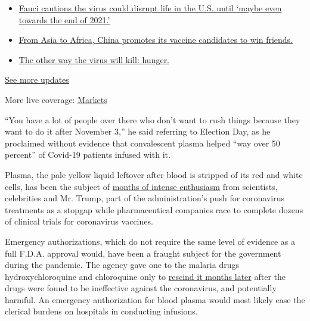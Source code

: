 \begin{itemize}
\tightlist
\item
  \href{https://www.nytimes3xbfgragh.onion/2020/09/11/world/covid-19-coronavirus.html?action=click\&pgtype=Article\&state=default\&region=MAIN_CONTENT_1\&context=storylines_live_updates\#link-dfb8a16}{Fauci
  cautions the virus could disrupt life in the U.S. until `maybe even
  towards the end of 2021.'}
\item
  \href{https://www.nytimes3xbfgragh.onion/2020/09/11/world/covid-19-coronavirus.html?action=click\&pgtype=Article\&state=default\&region=MAIN_CONTENT_1\&context=storylines_live_updates\#link-7104d154}{From
  Asia to Africa, China promotes its vaccine candidates to win friends.}
\item
  \href{https://www.nytimes3xbfgragh.onion/2020/09/11/world/covid-19-coronavirus.html?action=click\&pgtype=Article\&state=default\&region=MAIN_CONTENT_1\&context=storylines_live_updates\#link-393ad215}{The
  other way the virus will kill: hunger.}
\end{itemize}

\href{https://www.nytimes3xbfgragh.onion/2020/09/11/world/covid-19-coronavirus.html?action=click\&pgtype=Article\&state=default\&region=MAIN_CONTENT_1\&context=storylines_live_updates}{See
more updates}

More live coverage:
\href{https://www.nytimes3xbfgragh.onion/live/2020/09/11/business/stock-market-today-coronavirus?action=click\&pgtype=Article\&state=default\&region=MAIN_CONTENT_1\&context=storylines_live_updates}{Markets}

``You have a lot of people over there who don't want to rush things
because they want to do it after November 3,'' he said referring to
Election Day, as he proclaimed without evidence that convalescent plasma
helped ``way over 50 percent'' of Covid-19 patients infused with it.

Plasma, the pale yellow liquid leftover after blood is stripped of its
red and white cells, has been the subject of
\href{https://www.nytimes3xbfgragh.onion/2020/08/04/health/trump-plasma.html}{months
of intense enthusiasm} from scientists, celebrities and Mr. Trump, part
of the administration's push for coronavirus treatments as a stopgap
while pharmaceutical companies race to complete dozens of clinical
trials for coronavirus vaccines.

Emergency authorizations, which do not require the same level of
evidence as a full F.D.A. approval would, have been a fraught subject
for the government during the pandemic. The agency gave one to the
malaria drugs hydroxychloroquine and chloroquine only to
\href{https://www.nytimes3xbfgragh.onion/2020/06/15/health/fda-hydroxychloroquine-malaria.html}{rescind
it months later} after the drugs were found to be ineffective against
the coronavirus, and potentially harmful. An emergency authorization for
blood plasma would most likely ease the clerical burdens on hospitals in
conducting infusions.

